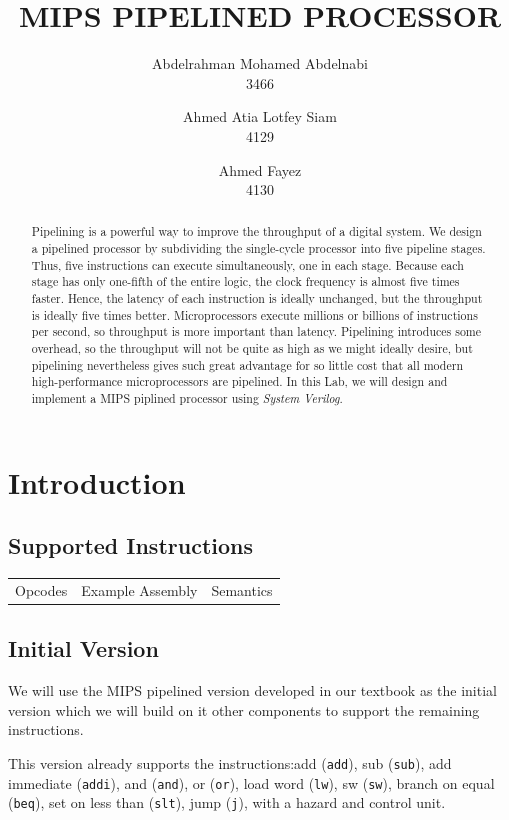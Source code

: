 \documentclass[titlepage,12pt,twoside,a4paper]{article}
\title{MIPS PIPELINED PROCESSOR}
\author{
	Abdelrahman Mohamed Abdelnabi\\
	3466
	\and
	Ahmed Atia Lotfey Siam \\
	4129
	\and
	Ahmed Fayez \\
	4130
}
\newcommand{\code}[1]{{\texttt{#1}}}
\begin{document}
\maketitle

\begin{abstract}
	Pipelining is a powerful way to improve the	throughput of a digital system. We design a pipelined processor by subdividing the single-cycle processor into five pipeline stages. Thus, five instructions can execute simultaneously, one in each stage. Because each stage has only one-fifth of the entire logic, the clock frequency is almost five times faster. Hence, the latency of each instruction is ideally unchanged, but the throughput is ideally five times better. Microprocessors execute millions or billions of instructions per second, so throughput is more important than latency. Pipelining introduces some overhead, so the throughput will not be quite as high as we might ideally desire, but pipelining nevertheless gives such great advantage for so little cost that all modern high-performance microprocessors are pipelined.
	In this Lab, we will design and implement a MIPS piplined  processor using\textit{ System Verilog}.
\end{abstract}



\section{Introduction}
\subsection{Supported Instructions}
\begin{tabular}{ccc}
	\label{ISA}
	Opcodes & Example Assembly & Semantics \\
	
\end{tabular}

\subsection{Initial Version}
We will use the MIPS pipelined version developed in our textbook as the initial version which we will build on it other components to support the remaining instructions.

This version already supports the instructions:add (\code{add}), sub (\code{sub}), add immediate (\code{addi}), and (\code{and}), or (\code{or}), load word (\code{lw}), sw (\code{sw}), branch on equal (\code{beq}), set on less than (\code{slt}), jump (\code{j}), with a hazard and control unit.
\end{document}
